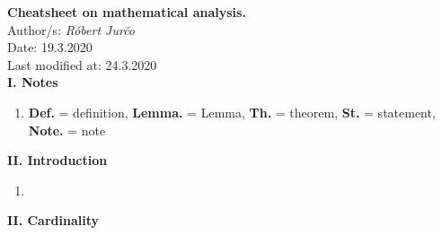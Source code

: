 \documentclass{article}
\newcommand{\<}{\left<}
\renewcommand{\>}{\right>}
\newcommand{\define}{\textbf{Def. }}
\newcommand{\lemma}{\textbf{Lemma. }}
\newcommand{\state}{\textbf{St. }}
\newcommand{\theor}{\textbf{Th. }}
\newcommand{\note}{\textbf{Note. }}
\begin{document}
\begin{multicols}{3}

    \textbf{Cheatsheet on mathematical analysis.}\\
    \indent Author/s: \emph{R\'obert Jur\v{c}o}\\
    \indent Date: 19.3.2020\\
    \indent Last modified at: 24.3.2020\\

    \textbf{I. Notes}

    \begin{enumerate}[itemsep=2pt, topsep=2pt, partopsep=2pt, parsep=2pt]
        \item \define = definition, \lemma = Lemma, \theor = theorem, \state = statement, \note = note
    \end{enumerate}


    \textbf{II. Introduction}

    \begin{enumerate}[itemsep=2pt, topsep=2pt, partopsep=2pt, parsep=2pt]

        \item

    \end{enumerate}

    \textbf{II. Cardinality}

    \begin{enumerate}[itemsep=2pt, topsep=2pt, partopsep=2pt, parsep=2pt]


\end{enumerate}
\end{multicols}
\end{document}
